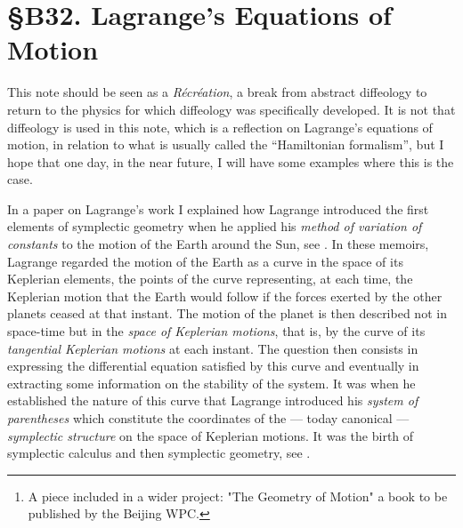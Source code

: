 
\chapter*{\S B32. Lagrange's Equations of Motion}%
\setcounter{footnote}{0}


\begin{abstract}
  In this note%
  \footnote{A piece included in a wider project: "The Geometry of {Motion}" a book to be published by the Beijing WPC.}
  I apply the Lagrange method of variation of constants to Newton's equations,
  by considering the force involved in the motion of a point as a perturbation of the absence of forces.
\end{abstract}


This note should be seen as a \emph{Récréation},
a break from abstract diffeology to return to the physics for which diffeology was specifically developed.
It is not that diffeology is used in this note,
which is a reflection on Lagrange's equations of motion,
in relation to what is usually called the ``Hamiltonian formalism'',
but I hope that one day, in the near future, I will have some examples where this is the case.

In a paper on Lagrange's work
I explained how Lagrange introduced
the first elements of symplectic geometry when he applied
his {\em method of variation of constants} to the motion
of the Earth around the Sun, see
\cite{Lag08,Lag09,Lag10}.
In these memoirs, Lagrange regarded the motion of the Earth as a curve in
the space of its Keplerian elements, the points of the curve representing,
at each time, the Keplerian motion that the Earth would follow if the forces
exerted by the other planets ceased at that instant.
The motion of the planet is then described not in space-time but in
the {\em space of Keplerian motions}, that is, by the curve of its
{\em tangential Keplerian motions}
at each instant. The question then consists
in expressing the differential equation satisfied by this curve and eventually
in extracting
some information on the stability of the system.
It was when he established the nature of this curve that Lagrange introduced his
{\em system of parentheses} which constitute
the coordinates of the --- today canonical --- {\em symplectic structure}
on the space of Keplerian motions.
It was the birth of symplectic calculus and then symplectic geometry,
see \cite{PIZ98,PIZ02}.

